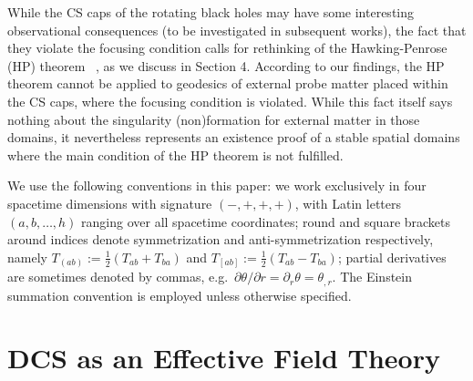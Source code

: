 \documentclass[prd,twocolumn,showpacs,superscriptaddress,nofootinbib]{revtex4-2}
\begin{document}
While the CS caps of the rotating black holes  may have some interesting observational consequences
(to be investigated in subsequent works), the fact that they violate the focusing condition calls 
for rethinking of the Hawking-Penrose (HP) theorem ~\cite{Penrose:1964wq, Hawking:1969sw}, 
as we discuss in Section 4. According to our findings, the HP theorem cannot be applied to geodesics of external probe 
matter placed within the CS caps, where the focusing condition is violated. While this fact itself
says nothing about the singularity (non)formation for  external matter in those domains, 
it nevertheless represents an existence proof of a stable spatial domains where the main 
condition of the HP theorem is not fulfilled.
  







We use the following conventions in this paper: we work exclusively in
four spacetime dimensions with signature
$(-,+,+,+)$, with Latin letters $(a,b,\ldots,h)$
ranging over all spacetime coordinates; round and
square brackets around indices denote symmetrization and
anti-symmetrization respectively, namely $T_{(ab)}:=\frac12
(T_{ab}+T_{ba})$ and $T_{[ab]}:=\frac12 (T_{ab}-T_{ba})$; partial
derivatives are sometimes denoted by commas, e.g.~$\partial
\theta/\partial r=\partial_r\theta=\theta_{,r}$. The Einstein
summation convention is employed unless otherwise specified.

\section{DCS as an Effective Field Theory}
\label{EFT}
\end{document}
